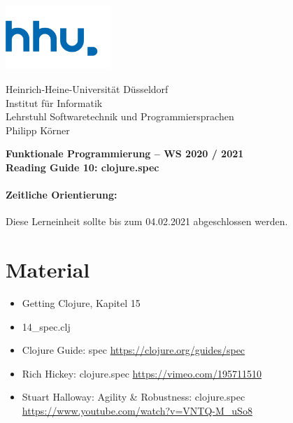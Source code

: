 \documentclass[11pt,a4paper]{article}
\theoremstyle{break}
\begin{document}
\begin{minipage}[b]{\textwidth}
\parbox[t]{5cm}{%
\includegraphics[width=4cm]{unilogo}
\hfill
}
\parbox[b]{11cm}{%
Heinrich-Heine-Universit\"at D\"usseldorf\\
Institut f\"ur Informatik\\
Lehrstuhl Softwaretechnik und Programmiersprachen\\
Philipp K\"orner
}

\end{minipage}
\begin{center}
\bf
Funktionale Programmierung -- WS 2020 / 2021\\
Reading Guide 10: clojure.spec
\end{center}

\pagestyle{empty}

\paragraph{Zeitliche Orientierung:} Diese Lerneinheit sollte bis zum 04.02.2021 abgeschlossen werden.

\section{Material} 

\begin{itemize}
    \item Getting Clojure, Kapitel 15
\item 14\_spec.clj
\item Clojure Guide: spec \url{https://clojure.org/guides/spec}
\item Rich Hickey: clojure.spec \url{https://vimeo.com/195711510}
\item Stuart Halloway: Agility \& Robustness: clojure.spec \url{https://www.youtube.com/watch?v=VNTQ-M_uSo8}
\end{itemize}
\end{document}
